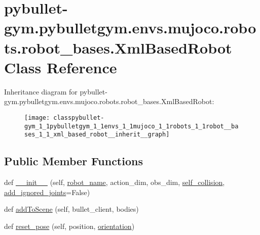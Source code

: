 \hypertarget{classpybullet-gym_1_1pybulletgym_1_1envs_1_1mujoco_1_1robots_1_1robot__bases_1_1_xml_based_robot}{}\section{pybullet-\/gym.pybulletgym.\+envs.\+mujoco.\+robots.\+robot\+\_\+bases.\+Xml\+Based\+Robot Class Reference}
\label{classpybullet-gym_1_1pybulletgym_1_1envs_1_1mujoco_1_1robots_1_1robot__bases_1_1_xml_based_robot}


Inheritance diagram for pybullet-\/gym.pybulletgym.\+envs.\+mujoco.\+robots.\+robot\+\_\+bases.\+Xml\+Based\+Robot\+:
\nopagebreak
\begin{figure}[H]
\begin{center}
\leavevmode
\texttt{[image: classpybullet-gym\_1\_1pybulletgym\_1\_1envs\_1\_1mujoco\_1\_1robots\_1\_1robot\_\_bases\_1\_1\_xml\_based\_robot\_\_inherit\_\_graph]}
\end{center}
\end{figure}
\subsection*{Public Member Functions}
\begin{DoxyCompactItemize}
\item 
def \hyperlink{classpybullet-gym_1_1pybulletgym_1_1envs_1_1mujoco_1_1robots_1_1robot__bases_1_1_xml_based_robot_aa5d710e71e518878122a3c325b6419de}{\+\_\+\+\_\+init\+\_\+\+\_\+} (self, \hyperlink{classpybullet-gym_1_1pybulletgym_1_1envs_1_1mujoco_1_1robots_1_1robot__bases_1_1_xml_based_robot_a5cbeb6a59e6f3507b1786ab2c99dad77}{robot\+\_\+name}, action\+\_\+dim, obs\+\_\+dim, \hyperlink{classpybullet-gym_1_1pybulletgym_1_1envs_1_1mujoco_1_1robots_1_1robot__bases_1_1_xml_based_robot_aecec207b8ac56d1e4c6035ab29c49969}{self\+\_\+collision}, \hyperlink{classpybullet-gym_1_1pybulletgym_1_1envs_1_1mujoco_1_1robots_1_1robot__bases_1_1_xml_based_robot_a290307cdae32fb1a8e067fd2a5642861}{add\+\_\+ignored\+\_\+joints}=False)
\item 
def \hyperlink{classpybullet-gym_1_1pybulletgym_1_1envs_1_1mujoco_1_1robots_1_1robot__bases_1_1_xml_based_robot_ae7aba077f6196b03a42715367ea3356a}{add\+To\+Scene} (self, bullet\+\_\+client, bodies)
\item 
def \hyperlink{classpybullet-gym_1_1pybulletgym_1_1envs_1_1mujoco_1_1robots_1_1robot__bases_1_1_xml_based_robot_a75c4ea33de095df09610ccf098de5950}{reset\+\_\+pose} (self, position, \hyperlink{namespacepybullet-gym_1_1pybulletgym_1_1envs_1_1mujoco_1_1robots_1_1robot__bases_a43c43149f85e8e7a4ac1b66c78f6290f}{orientation})
\end{DoxyCompactItemize}
